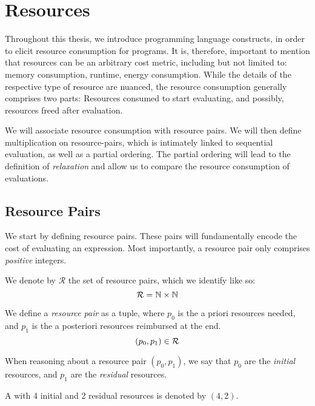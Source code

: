 \chapter{Resources}

Throughout this thesis, we introduce programming language constructs, in order to elicit resource consumption for programs. It is, therefore, important to mention that resources can be an arbitrary cost metric, including but not limited to: memory consumption, runtime, energy consumption. While the details of the respective type of resource are nuanced, the resource consumption generally comprises two parts: Resources consumed to start evaluating, and possibly, resources freed after evaluation.

We will associate resource consumption with resource pairs. We will then define multiplication on resource-pairs, which is intimately linked to sequential evaluation, as well as a partial ordering. The partial ordering will lead to the definition of \emph{relaxation} and allow us to compare the resource consumption of evaluations. 

\section{Resource Pairs}

We start by defining resource pairs. These pairs will fundamentally encode the cost of evaluating an expression. Most importantly, a resource pair only comprises \emph{positive} integers. 

\begin{definition}[Resources]
   We denote by \(\mathcal{R}\) the set of resource pairs, which we identify like so:
   \[
      \mathcal{R} = \mathbb{N} \times \mathbb{N}
   \]
\end{definition}

\begin{definition}
   \label{def:resource-pair}
   We define a \emph{resource pair} as a tuple, where \(p_0\) is the a priori resources needed, and \(p_1\) is the a posteriori resources reimbursed at the end.
   \[
      (p_0, p_1) \in \mathcal{R}
   \]
\end{definition}

When reasoning about a resource pair \((p_0, p_1)\), we say that \(p_0\) are the \emph{initial} resources, and \(p_1\) are the \emph{residual} resources. 

\begin{example}
   A  with 4 initial and 2 residual resources is denoted by \((4, 2)\).
\end{example}

